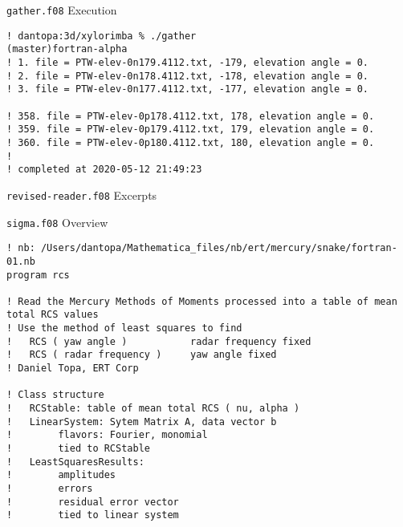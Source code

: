 \begin{frame} {\texttt{gather.f08} Execution}
\scriptsize
\begin{lstlisting}[style=terminal, breaklines=true, caption={Excerpt from \texttt{gather.f08}}, label={lst:gather-execution}]
! dantopa:3d/xylorimba % ./gather                                                                                                                             (master)fortran-alpha
! 1. file = PTW-elev-0n179.4112.txt, -179, elevation angle = 0.
! 2. file = PTW-elev-0n178.4112.txt, -178, elevation angle = 0.
! 3. file = PTW-elev-0n177.4112.txt, -177, elevation angle = 0.

! 358. file = PTW-elev-0p178.4112.txt, 178, elevation angle = 0.
! 359. file = PTW-elev-0p179.4112.txt, 179, elevation angle = 0.
! 360. file = PTW-elev-0p180.4112.txt, 180, elevation angle = 0.
!
! completed at 2020-05-12 21:49:23
\end{lstlisting}
\end{frame}

\begin{frame}{\texttt{revised-reader.f08} Excerpts}
\scriptsize



\end{frame}


\begin{frame}{\texttt{sigma.f08} Overview}
\scriptsize
\begin{lstlisting}[style=terminal, breaklines=true, caption={Excerpt from \texttt{sigma.f08}}, label={lst:sigma-overview}]
! nb: /Users/dantopa/Mathematica_files/nb/ert/mercury/snake/fortran-01.nb
program rcs

! Read the Mercury Methods of Moments processed into a table of mean total RCS values
! Use the method of least squares to find
!   RCS ( yaw angle )           radar frequency fixed
!   RCS ( radar frequency )     yaw angle fixed
! Daniel Topa, ERT Corp

! Class structure
!   RCStable: table of mean total RCS ( nu, alpha )
!   LinearSystem: Sytem Matrix A, data vector b
!        flavors: Fourier, monomial
!        tied to RCStable
!   LeastSquaresResults:
!        amplitudes
!        errors
!        residual error vector
!        tied to linear system
\end{lstlisting}
\end{frame}

